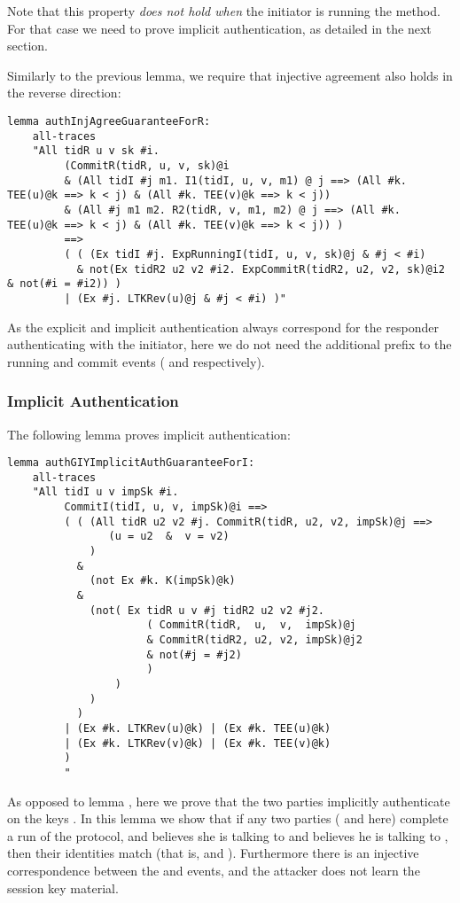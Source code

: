 Note that this property \emph{does not hold when} the initiator is
running the \mStat{} method.
%
For that case we need to prove implicit authentication, as detailed in
the next section.

Similarly to the previous lemma, we require that injective agreement also holds
in the reverse direction:

\begin{lstlisting}
lemma authInjAgreeGuaranteeForR:
    all-traces
    "All tidR u v sk #i.
         (CommitR(tidR, u, v, sk)@i
	     & (All tidI #j m1. I1(tidI, u, v, m1) @ j ==> (All #k. TEE(u)@k ==> k < j) & (All #k. TEE(v)@k ==> k < j))
         & (All #j m1 m2. R2(tidR, v, m1, m2) @ j ==> (All #k. TEE(u)@k ==> k < j) & (All #k. TEE(v)@k ==> k < j)) )
         ==>
         ( ( (Ex tidI #j. ExpRunningI(tidI, u, v, sk)@j & #j < #i)
           & not(Ex tidR2 u2 v2 #i2. ExpCommitR(tidR2, u2, v2, sk)@i2 & not(#i = #i2)) )
         | (Ex #j. LTKRev(u)@j & #j < #i) )"
\end{lstlisting}

As the explicit and implicit authentication always correspond for the
responder authenticating with the initiator, here we do not need the
additional  prefix to the running and commit events
( and  respectively).

 
\subsubsection{Implicit Authentication}

The following lemma proves implicit authentication:
\begin{lstlisting}
lemma authGIYImplicitAuthGuaranteeForI:
    all-traces
    "All tidI u v impSk #i.
         CommitI(tidI, u, v, impSk)@i ==>
         ( ( (All tidR u2 v2 #j. CommitR(tidR, u2, v2, impSk)@j ==>
                (u = u2  &  v = v2)
             )
           &
             (not Ex #k. K(impSk)@k)
           &
             (not( Ex tidR u v #j tidR2 u2 v2 #j2.
                      ( CommitR(tidR,  u,  v,  impSk)@j
                      & CommitR(tidR2, u2, v2, impSk)@j2
                      & not(#j = #j2)
                      )
                 )
             )
           )
         | (Ex #k. LTKRev(u)@k) | (Ex #k. TEE(u)@k)
         | (Ex #k. LTKRev(v)@k) | (Ex #k. TEE(v)@k)
         )
         "
\end{lstlisting}

As opposed to lemma , here we prove that the two
parties implicitly authenticate on the keys . %
In this lemma we show that if any two parties ( and  here) complete
a run of the protocol, and  believes she is talking to  and 
believes he is talking to , then their identities match (that is,
 and ). Furthermore there is an injective correspondence
between the  and  events, and the attacker does not
learn the session key material.

